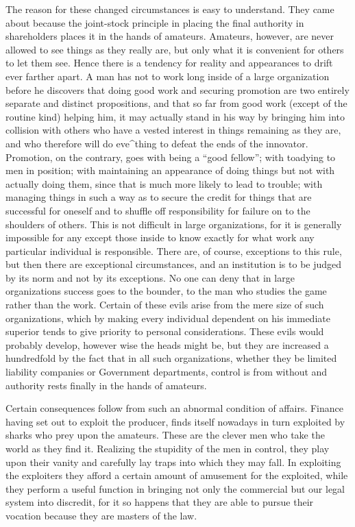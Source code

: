 \documentclass{book}
\begin{document}
The reason for these changed circumstances is easy to understand. They came about because the joint-stock principle in placing the final authority in shareholders places it in the hands of amateurs. Amateurs, however, are never allowed to see things as they really are, but only what it is convenient for others to let them see. Hence there is a tendency for reality and appearances to drift ever farther apart. A man has not to work long inside of a large organization before he discovers that doing good work and securing promotion are two entirely separate and distinct propositions, and that so far from good work (except of the routine kind) helping him, it may actually stand in his way by bringing him into collision with others who have a vested interest in things remaining as they are, and who therefore will do eve\textasciicircum{}thing to defeat the ends of the innovator. Promotion, on the contrary, goes with being a “good fellow”; with toadying to men in position; with maintaining an appearance of doing things but not with actually doing them, since that is much more likely to lead to trouble; with managing things in such a way as to secure the credit for things that are successful for oneself and to shuffle off responsibility for failure on to the shoulders of others. This is not difficult in large organizations, for it is generally impossible for any except those inside to know exactly for what work any particular individual is responsible. There are, of course, exceptions to this rule, but then there are exceptional circumstances, and an institution is to be judged by its norm and not by its exceptions. No one can deny that in large organizations success goes to the bounder, to the man who studies the game rather than the work. Certain of these evils arise from the mere size of such organizations, which by making every individual dependent on his immediate superior tends to give priority to personal considerations. These evils would probably develop, however wise the heads might be, but they are increased a hundredfold by the fact that in all such organizations, whether they be limited liability companies or Government departments, control is from without and authority rests finally in the hands of amateurs.

Certain consequences follow from such an abnormal condition of affairs. Finance having set out to exploit the producer, finds itself nowadays in turn exploited by sharks who prey upon the amateurs. These are the clever men who take the world as they find it. Realizing the stupidity of the men in control, they play upon their vanity and carefully lay traps into which they may fall. In exploiting the exploiters they afford a certain amount of amusement for the exploited, while they perform a useful function in bringing not only the commercial but our legal system into discredit, for it so happens that they are able to pursue their vocation because they are masters of the law.
\end{document}
